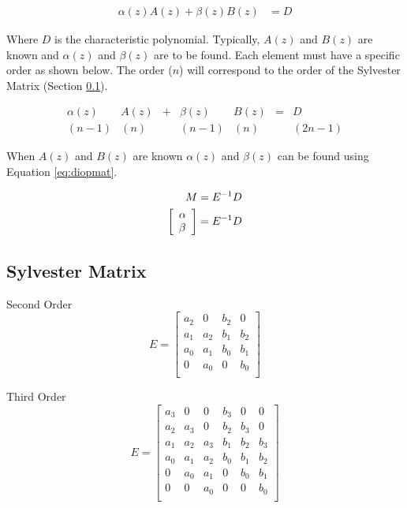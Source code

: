\documentclass{article}
\begin{document}
\begin{align}
	\alpha(z)A(z) + \beta(z)B(z) &= D \label{eq:diophantine}
\end{align}

Where $D$ is the characteristic polynomial.
Typically, $A(z)$ and $B(z)$ are known and $\alpha(z)$ and $\beta(z)$
are to be found.
Each element must have a specific order as shown below.
The order ($n$) will correspond to the order of the
Sylvester Matrix (Section \ref{sec:sylvester}).

\[
\begin{array}{ccccccc}
	\alpha(z) &A(z) &+ &\beta(z) &B(z) &= &D \\
	  (n-1)   &(n)  &  & (n-1)  &(n) & &(2n-1)
\end{array}
\]

When $A(z)$ and $B(z)$ are known $\alpha(z)$ and $\beta(z)$
can be found using Equation \ref{eq:diopmat}.

\begin{align}
	M &= E^{-1} D \label{eq:diopmat} \\
	\left[
	\begin{array}{l}
		\alpha \\
		\beta
	\end{array}
	\right] &= E^{-1} D \notag
\end{align}

\subsection{Sylvester Matrix}
\label{sec:sylvester}

Second Order
\[
E=
\begin{bmatrix}
	a_2 & 0 & b_2 & 0 \\
	a_1 & a_2 & b_1 & b_2 \\
	a_0 & a_1 & b_0 & b_1 \\
	0 & a_0 & 0 & b_0 \\
\end{bmatrix}
\]

Third Order
\[
E=
\begin{bmatrix}
	a_3 & 0 & 0 & b_3 & 0 & 0 \\
	a_2 & a_3 & 0 & b_2 & b_3 & 0 \\
	a_1 & a_2 & a_3 & b_1 & b_2 & b_3 \\
	a_0 & a_1 & a_2 & b_0 & b_1 & b_2 \\
	0 & a_0 & a_1 & 0 & b_0 & b_1 \\
	0 & 0 & a_0 & 0 & 0 & b_0 \\
\end{bmatrix}
\]
\end{document}
